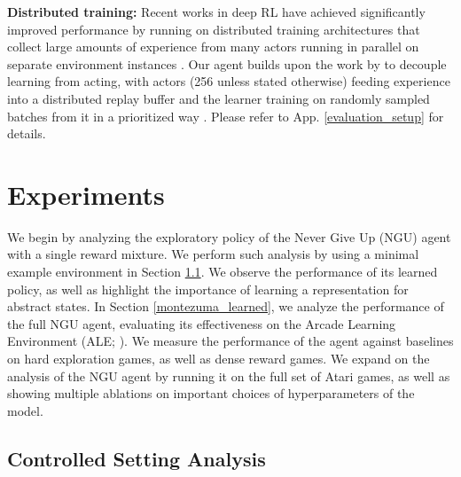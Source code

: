 \documentclass{article} \usepackage{iclr2020_conference,times}
\begin{document}
{\bf Distributed training:}
Recent works in deep RL have achieved significantly improved performance by running on distributed training architectures that collect large amounts of experience from many actors running in parallel on separate environment instances \citep{andrychowicz2018learning, barth2018distributed,  burda2018exploration,espeholt2018impala, horgan2018distributed, r2d2,silver2016mastering}.
Our agent builds upon the work by \cite{r2d2} to decouple learning from acting,
with actors (256 unless stated otherwise) feeding experience into a distributed replay buffer and the learner training on randomly sampled batches from it in a prioritized way \citep{PrioritizedReplay}.
Please refer to App. \ref{evaluation_setup} for details.


\section{Experiments}
\label{experiments}

We begin by analyzing the exploratory policy of the Never Give Up (NGU) agent with a single reward mixture. We perform such analysis by using a minimal example environment in Section \ref{embedding_representation}. We observe the performance of its learned policy, as well as highlight the importance of learning a representation for abstract states.
In Section \ref{montezuma_learned}, we analyze the performance of the full NGU agent, evaluating its effectiveness on the Arcade Learning Environment (ALE; \cite{bellemare2013arcade}). We measure the performance of the agent against baselines on hard exploration games, as well as dense reward games.
We expand on the analysis of the NGU agent by running it on the full set of Atari games, as well as showing multiple ablations on important choices of hyperparameters of the model.

\subsection{Controlled Setting Analysis}
\label{embedding_representation}
\end{document}
